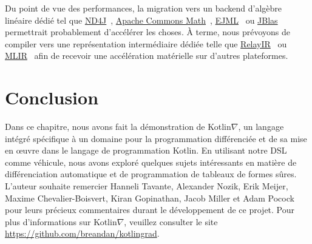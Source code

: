 Du point de vue des performances, la migration vers un backend d'algèbre linéaire dédié tel que \href{https://deeplearning4j.org/docs/latest/nd4j-overview}{ND4J}~\citep{team2016nd4j}, \href{https://commons.apache. org/proper/commons-math/}{Apache Commons Math}~\citep{developers2012apache}, \href{http://ejml.org}{EJML}~\citep{abeles2010efficient} ou \href{http://jblas.org/}{JBlas}~\citep{braun2011jblas} permettrait probablement d'accélérer les choses. À terme, nous prévoyons de compiler vers une représentation intermédiaire dédiée telle que \href{https://docs.tvm.ai/dev/relay_intro.html}{RelayIR}~\citep{roesch2018relay} ou \href{https://www.tensorflow.org/mlir}{MLIR}~\citep{mlir} afin de recevoir une accélération matérielle sur d'autres plateformes.

\section{Conclusion}

Dans ce chapitre, nous avons fait la démonstration de Kotlin$\nabla$, un langage intégré spécifique à un domaine pour la programmation différenciée et de sa mise en œuvre dans le langage de programmation Kotlin. En utilisant notre DSL comme véhicule, nous avons exploré quelques sujets intéressants en matière de différenciation automatique et de programmation de tableaux de formes sûres. L'auteur souhaite remercier Hanneli Tavante, Alexander Nozik, Erik Meijer, Maxime Chevalier-Boisvert, Kiran Gopinathan, Jacob Miller et Adam Pocock pour leurs précieux commentaires durant le développement de ce projet. Pour plus d'informations sur Kotlin$\nabla$, veuillez consulter le site \url{https://github.com/breandan/kotlingrad}.
